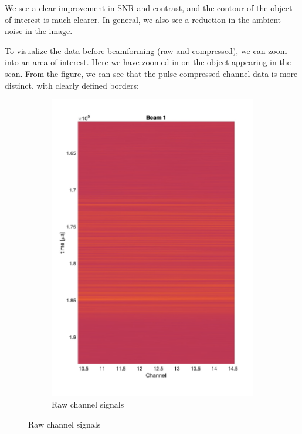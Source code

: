 \documentclass{article}
\begin{document}
We see a clear improvement in SNR and contrast, and the contour of the object of interest is much clearer. In general, we also see a reduction in the ambient noise in the image.


To visualize the data before beamforming (raw and compressed), we can zoom into an area of interest. Here
we have zoomed in on the object appearing in the scan. From the figure, we can see that the pulse compressed channel data
is more distinct, with clearly defined borders:


\begin{figure}[ht]
    \centering
    \begin{subfigure}{0.3\textwidth} %
        \centering
        \includegraphics[width=\linewidth]{raw.jpg} %
        \caption{Raw channel signals}

\end{subfigure}
\end{figure}
\end{document}
